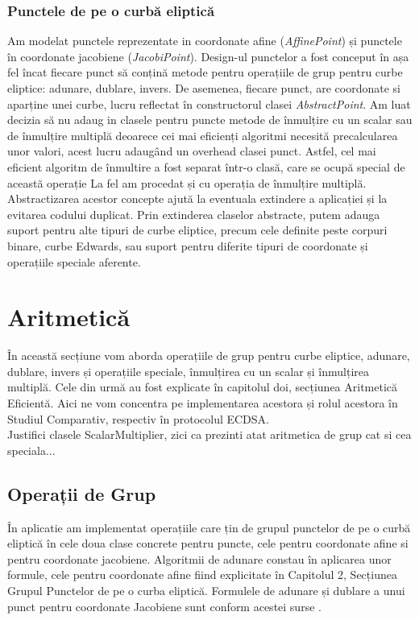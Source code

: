 \subsubsection{Punctele de pe o curbă eliptică}

Am modelat punctele reprezentate in coordonate afine (\textit{AffinePoint}) și punctele în coordonate jacobiene (\textit{JacobiPoint}).
Design-ul punctelor a fost conceput în așa fel încat fiecare punct să conțină metode pentru operațiile de grup pentru curbe eliptice: adunare, dublare, invers. De asemenea, fiecare punct, are coordonate si aparține unei curbe, lucru reflectat în constructorul clasei \textit{AbstractPoint}. Am luat decizia să nu adaug in clasele pentru puncte metode de înmulțire cu un scalar sau de înmulțire multiplă deoarece cei mai eficienți algoritmi necesită precalcularea unor valori, acest lucru adaugând un overhead clasei punct. Astfel, cel mai eficient algoritm de înmultire a fost separat într-o clasă, care se ocupă special de această operație La fel am procedat și cu operația de înmulțire multiplă. \\

Abstractizarea acestor concepte ajută la eventuala extindere a aplicației și la evitarea codului duplicat. Prin extinderea claselor abstracte, putem adauga suport pentru alte tipuri de curbe eliptice, precum cele definite peste corpuri binare, curbe Edwards, sau suport pentru diferite tipuri de coordonate și operațiile speciale aferente.


\section{Aritmetică}
\label{subsec:subsec02}
În această secțiune vom aborda operațiile de grup pentru curbe eliptice, adunare, dublare, invers și operațiile speciale, înmulțirea cu un scalar și înmulțirea multiplă. Cele din urmă au fost explicate în capitolul doi, secțiunea Aritmetică Eficientă. Aici ne vom concentra pe implementarea acestora și rolul acestora în Studiul Comparativ, respectiv în protocolul ECDSA. \\

Justifici clasele ScalarMultiplier, zici ca prezinti  atat aritmetica de grup cat si cea speciala... 

\subsection{Operații de Grup}
În aplicatie am implementat operațiile care țin de grupul punctelor de pe o curbă eliptică în cele doua clase concrete pentru puncte, cele pentru coordonate afine si pentru coordonate jacobiene. Algoritmii de adunare constau în aplicarea unor formule, cele pentru coordonate afine fiind explicitate în Capitolul 2, Secțiunea Grupul Punctelor de pe o curba eliptică. Formulele de adunare și dublare a unui punct pentru coordonate Jacobiene sunt conform acestei surse \cite{jacobian}.


